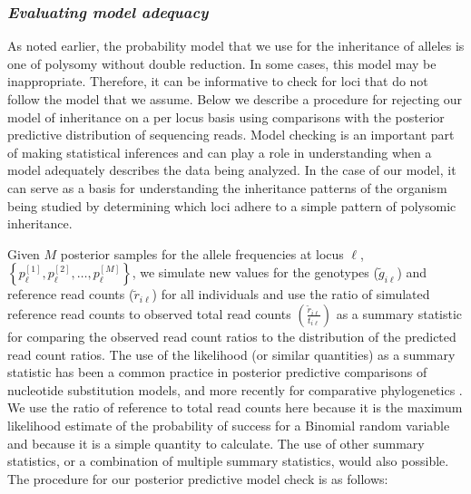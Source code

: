 \documentclass[11pt,english,letterpaper,oneside]{article}
\begin{document}
\subsubsection{{\itshape Evaluating model adequacy}}
\medskip

As noted earlier, the probability model that we use for the inheritance of alleles is one of polysomy without double reduction. In some cases, this model may be inappropriate. Therefore, it can be informative to check for loci that do not follow the model that we assume. Below we describe a procedure for rejecting our model of inheritance on a per locus basis using comparisons with the posterior predictive distribution of sequencing reads. Model checking is an important part of making statistical inferences and can play a role in understanding when a model adequately describes the data being analyzed. In the case of our model, it can serve as a basis for understanding the inheritance patterns of the organism being studied by determining which loci adhere to a simple pattern of polysomic inheritance.
\medskip

Given $M$ posterior samples for the allele frequencies at locus $\ell$, $\left\{p_{\ell}^{[1]},p_{\ell}^{[2]},\ldots,p_{\ell}^{[M]} \right\}$, we simulate new values for the genotypes ($\tilde{g}_{i \ell}$) and reference read counts ($\tilde{r}_{i \ell}$) for all individuals and use the ratio of simulated reference read counts to observed total read counts $\left( \frac{\tilde{r}_{i \ell}}{t_{i \ell}} \right) $ as a summary statistic for comparing the observed read count ratios to the distribution of the predicted read count ratios. The use of the likelihood (or similar quantities) as a summary statistic has been a common practice in posterior predictive comparisons of nucleotide substitution models, and more recently for comparative phylogenetics \citep{ripplinger2010DNAmodels,reid2014poorfit,pennell2015adequacy}. We use the ratio of reference to total read counts here because it is the maximum likelihood estimate of the probability of success for a Binomial random variable and because it is a simple quantity to calculate. The use of other summary statistics, or a combination of multiple summary statistics, would also possible. The procedure for our posterior predictive model check is as follows:
\medskip
\end{document}
